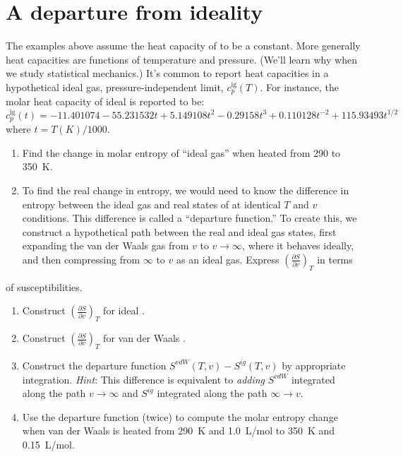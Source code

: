 \documentclass[11pt]{article}
\begin{document}
\section{A departure from ideality}
\label{sec:org6d06299}
The examples above assume the heat capacity of  to be a constant. More
generally heat capacities are functions of temperature and pressure. (We'll learn why when
we study statistical mechanics.)  It's common to report heat capacities in a hypothetical
ideal gas, pressure-independent limit, \(c_{p}^\text{ig}(T)\).  For instance, the molar heat
capacity of ideal  is reported to be:
\begin{equation*}
  c_p^\text{ig}(t) = -11.401074 - 55.231532t+5.149108t^2-0.29158t^3+0.110128t^{-2}+115.93493t^{1/2}
\end{equation*}
where \(t=T(K)/1000\).

\begin{enumerate}
\item Find the change in molar entropy of ``ideal gas''  when heated from 290 to
\SI{350}{K}.

\item To find the real change in entropy, we would need to know the difference in entropy
between the ideal gas and real states of  at identical \(T\) and \(v\) conditions.  This
difference is called a ``departure function.'' To create this, we construct a hypothetical
path between the real and ideal gas states, first expanding the van der Waals gas
from \(v\) to \(v\rightarrow \infty\), where it behaves ideally, and then compressing from \(\infty\)
to \(v\) as an ideal gas.  Express \(\left ( \frac{\partial S}{\partial v}\right )_{T}\) in terms
\end{enumerate}
of susceptibilities.

\begin{enumerate}
\item Construct \(\left ( \frac{\partial S}{\partial v}\right)_{T}\) for ideal .

\item Construct \(\left ( \frac{\partial S}{\partial v}\right)_{T}\) for van der Waals
.

\item Construct the departure function \(S^{vdW}(T,v) - S^{ig}(T,v)\) by appropriate integration.  \emph{Hint}: This difference is equivalent to \emph{adding} \(S^{vdW}\) integrated along the path \(v \rightarrow\infty\) and \(S^{ig}\) integrated along the path \(\infty \rightarrow v\).

\item Use the departure function (twice) to compute the molar entropy change when van der Waals
 is heated from \SI{290}{K} and \SI{1.0}{L/mol} to \SI{350}{K} and \SI{0.15}{L/mol}.
\end{enumerate}
\end{document}
